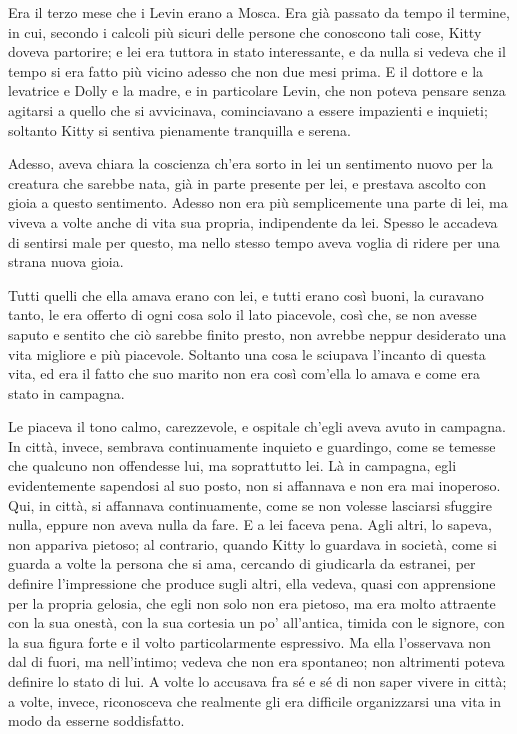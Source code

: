\label{parte-settima} 
\pagestyle{pagina}

Era il terzo mese che i Levin erano a Mosca. Era già passato da tempo il termine, in cui, secondo i calcoli più sicuri delle persone che conoscono tali cose, Kitty doveva partorire; e lei era tuttora in stato interessante, e da nulla si vedeva che il tempo si era fatto più vicino adesso che non due mesi prima. E il dottore e la levatrice e Dolly e la madre, e in particolare Levin, che non poteva pensare senza agitarsi a quello che si avvicinava, cominciavano a essere impazienti e inquieti; soltanto Kitty si sentiva pienamente tranquilla e serena. 

Adesso, aveva chiara la coscienza ch'era sorto in lei un sentimento nuovo per la creatura che sarebbe nata, già in parte presente per lei, e prestava ascolto con gioia a questo sentimento. Adesso non era più semplicemente una parte di lei, ma viveva a volte anche di vita sua propria, indipendente da lei. Spesso le accadeva di sentirsi male per questo, ma nello stesso tempo aveva voglia di ridere per una strana nuova gioia. 

Tutti quelli che ella amava erano con lei, e tutti erano così buoni, la curavano tanto, le era offerto di ogni cosa solo il lato piacevole, così che, se non avesse saputo e sentito che ciò sarebbe finito presto, non avrebbe neppur desiderato una vita migliore e più piacevole. Soltanto una cosa le sciupava l'incanto di questa vita, ed era il fatto che suo marito non era così com'ella lo amava e come era stato in campagna. 

Le piaceva il tono calmo, carezzevole, e ospitale ch'egli aveva avuto in campagna. In città, invece, sembrava continuamente inquieto e guardingo, come se temesse che qualcuno non offendesse lui, ma soprattutto lei. Là in campagna, egli evidentemente sapendosi al suo posto, non si affannava e non era mai inoperoso. Qui, in città, si affannava continuamente, come se non volesse lasciarsi sfuggire nulla, eppure non aveva nulla da fare. E a lei faceva pena. Agli altri, lo sapeva, non appariva pietoso; al contrario, quando Kitty lo guardava in società, come si guarda a volte la persona che si ama, cercando di giudicarla da estranei, per definire l'impressione che produce sugli altri, ella vedeva, quasi con apprensione per la propria gelosia, che egli non solo non era pietoso, ma era molto attraente con la sua onestà, con la sua cortesia un po' all'antica, timida con le signore, con la sua figura forte e il volto particolarmente espressivo. Ma ella l'osservava non dal di fuori, ma nell'intimo; vedeva che non era spontaneo; non altrimenti poteva definire lo stato di lui. A volte lo accusava fra sé e sé di non saper vivere in città; a volte, invece, riconosceva che realmente gli era difficile organizzarsi una vita in modo da esserne soddisfatto. 

